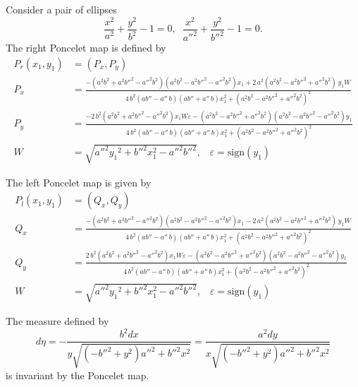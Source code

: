 Consider a pair of ellipses
\[\frac{x^2}{a^2}+\frac{y^2}{b^2}-1=0,\;\;\frac{x^2}{a''^2}+\frac{y^2}{b''^2}-1=0. \]
The right Poncelet map is defined by
\begin{align*}
    P_r(x_1,y_1)& = (P_x,P_y)\\
    P_x&= {\frac {- \left( {a}^{2}{b}^{2}+{a}^{2}b''^{2}-a''^{2}{b
}^{2} \right)  \left( {a}^{2}{b}^{2}-{a}^{2}b''^{2}-a''^
{2}{b}^{2} \right) x_1+2\,{a}^{2} \left( {a}^{2}{b}^{2}-{a}^{2}{b''
}^{2}+a''^{2}{b}^{2} \right)  \,y_1 W }{4\,{b}^{2} \left( ab''-a''\,b \right)  \left( ab''+a''\,b \right) x_1^{2}+
 \left( {a}^{2}{b}^{2}-{a}^{2}b''^{2}+a''^{2}{b}^{2}
 \right) ^{2}}}\\
 P_y&={\frac {-2\,{b}^{2} \left( {a}^{2}{b}^{2}+{a}^{2}b''^{2}-a''^{2}{b}^{2} \right)  x_1W \varepsilon- \left( {a}^{2}{b}^{2}-{a}^{2}b''^{2
}+a''^{2}{b}^{2} \right)  \left( {a}^{2}{b}^{2}-{a}^{2}b''^{2}-a''^{2}{b}^{2} \right) y_1}{4\,{b}^{2} \left( ab''-a''\,b \right)  \left( ab''+a''\,b \right) x_1^{2}+
 \left( {a}^{2}{b}^{2}-{a}^{2}b''^{2}+a''^{2}{b}^{2}
 \right) ^{2}}}\\
 W&=\sqrt {a''^{2}{y_1}^{2}+b''^{2}x_1^{2} -a''^{2}b''^{2}},\;\;\;\varepsilon=\mathrm{sign}(y_1)
\end{align*} 

The left   Poncelet map is given by
\begin{align*}
    P_l(x_1,y_1)& = (Q_x,Q_y)\\
    Q_x&= {\frac {- \left( {a}^{2}{b}^{2}+{a}^{2}b''^{2}-a''^{2}{b
}^{2} \right)  \left( {a}^{2}{b}^{2}-{a}^{2}b''^{2}-a''^
{2}{b}^{2} \right) x_1-2\,{a}^{2} \left( {a}^{2}{b}^{2}-{a}^{2}{b''
}^{2}+a''^{2}{b}^{2} \right)  \,y_1 W}{4\,{b}^{2} \left( ab''-a''\,b \right)  \left( ab''+a''\,b \right) x_1^{2}+
 \left( {a}^{2}{b}^{2}-{a}^{2}b''^{2}+a''^{2}{b}^{2}
 \right) ^{2}}}\\
 Q_y&={\frac {2\,{b}^{2} \left( {a}^{2}{b}^{2}+{a}^{2}b''^{2}-a''^{2}{b}^{2} \right)  x_1W\varepsilon- \left( {a}^{2}{b}^{2}-{a}^{2}b''^{2
}+a''^{2}{b}^{2} \right)  \left( {a}^{2}{b}^{2}-{a}^{2}b''^{2}-a''^{2}{b}^{2} \right) y_1}{4\,{b}^{2} \left( ab''-a''\,b \right)  \left( ab''+a''\,b \right) x_1^{2}+
 \left( {a}^{2}{b}^{2}-{a}^{2}b''^{2}+a''^{2}{b}^{2}
 \right) ^{2}}}\\
 W&=\sqrt {a''^{2}{y_1}^{2}+b''^{2}x_1^{2} -a''^{2}b''^{2}},\;\;\;\varepsilon=\mathrm{sign}(y_1)
\end{align*}

The measure defined by
\[ d\eta=-{\frac {{b}^{2}{  dx}}{y\sqrt { \left( -b''^{2}+{y}^{2}
 \right) a''^{2}+b''^{2}{x}^{2}}}}={\frac {{a}^{2}{  dy}}{x \sqrt { \left( -b''^{2}+{y}^{2}
 \right) a''^{2}+b''^{2}{x}^{2}} }}\]
 is invariant by the Poncelet map.

